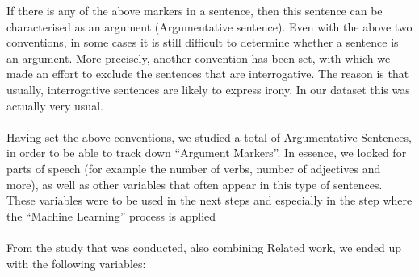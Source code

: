 If there is any of the above markers in a sentence, then this sentence can be characterised as an argument (Argumentative sentence). Even with the above two conventions, in some cases it is still difficult to determine whether a sentence is an argument. More precisely, another convention has been set, with which we made an effort to exclude the sentences that are interrogative. The reason is that usually, interrogative sentences are likely to express irony. In our dataset this was actually very usual.\\
\\
Having set the above conventions, we studied a total of Argumentative Sentences, in order to be able to track down ``Argument Markers''. In essence, we looked for parts of speech (for example the number of verbs, number of adjectives and more), as well as other variables that often appear in this type of sentences. These variables were to be used in the next steps and especially in the step where the ``Machine Learning'' process is applied\\
\\
From the study that was conducted, also combining Related work, we ended up with the following variables:\\
\\
